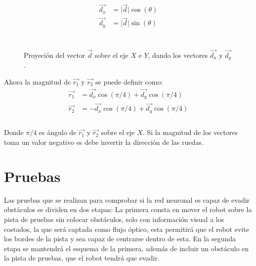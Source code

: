 \documentclass{iccmemoria}
\begin{document}
\begin{equation}
	\begin{split}
	\vec{d_{x}} & = \lvert \vec{d} \rvert \cos(\theta)\\
	\vec{d_{y}} & = \lvert \vec{d} \rvert \sin(\theta)\\
	\end{split}
\end{equation}\\

\begin{figure}[H]
  \centering
  \begin{large}
  
  \end{large}
  \caption{Proyeción del vector $\vec{d}$ sobre el eje $X$ e $Y$, dando los vectores $\vec{d_{x}}$ y $\vec{d_{y}}$ .}
  \label{fig:vec_proyection}
\end{figure}

Ahora la magnitud de $\vec{r_{1}}$ y $\vec{r_{2}}$ se puede definir como:\\

\begin{equation}
	\begin{split}
	\vec{r_{1}} & = \vec{d_{x}}\cos(\pi/4)  + \vec{d_{y}}\cos(\pi/4)\\
	\vec{r_{2}} & = -\vec{d_{x}}\cos(\pi/4) + \vec{d_{y}}\cos(\pi/4)\\
	\end{split}
\end{equation}\\

Donde $\pi/4$ es ángulo de $\vec{r_{1}}$ y $\vec{r_{2}}$ sobre el eje $X$. Si la magnitud de los vectores toma un valor negativo es debe invertir la dirección de las ruedas.\\

\chapter{Pruebas}

Las pruebas que se realizan para comprobar si la red neuronal es capaz de evadir obstáculos se dividen en dos etapas: La primera consta en mover el robot sobre la pista de pruebas sin colocar obstáculos, solo con información visual a los costados, la que será captada como flujo óptico, esta permitirá que el robot evite los bordes de la pista y sea capaz de centrarse dentro de esta. En la segunda etapa se mantendrá el esquema de la primera, además de incluir un obstáculo en la pista de pruebas, que el robot tendrá que evadir.\\
\end{document}
